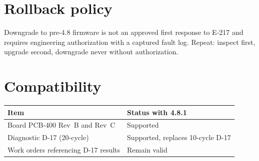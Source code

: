 \documentclass[11pt,a4paper]{article}
\begin{document}
\section{Rollback policy}
Downgrade to pre-4.8 firmware is not an approved first response to E-217 and
requires engineering authorization with a captured fault log. Repeat: inspect
first, upgrade second, downgrade never without authorization.

\section{Compatibility}
\begin{table}[h]
\centering
\begin{tabular}{ll}
\toprule
Item & Status with 4.8.1 \\
\midrule
Board PCB-400 Rev~B and Rev~C & Supported \\
Diagnostic D-17 (20-cycle) & Supported, replaces 10-cycle D-17 \\
Work orders referencing D-17 results & Remain valid \\
\bottomrule
\end{tabular}
\end{table}
\end{document}
